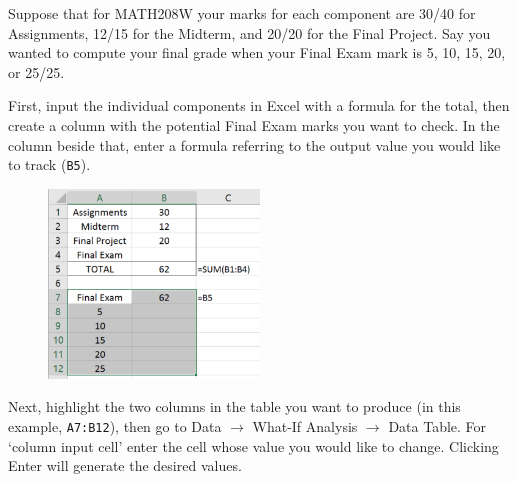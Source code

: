\begin{myexample}
Suppose that for MATH208W your marks for each component are 30/40 for Assignments, 12/15 for the Midterm, and 20/20 for the Final Project.
Say you wanted to compute your final grade when your Final Exam mark is 5, 10, 15, 20, or 25/25.

First, input the individual components in Excel with a formula for the total, then create a column with the potential Final Exam marks you want to check.
In the column beside that, enter a formula referring to the output value you would like to track (\texttt{B5}).

\begin{figure}[htbp]
	\centering
	\includegraphics[width=0.5\textwidth]{fig/2_data_table_exA.png}
	\label{fig:2_data_table_exA}
\end{figure}

Next, highlight the two columns in the table you want to produce (in this example, \texttt{A7:B12}), then go to Data $\rightarrow$ What-If Analysis $\rightarrow$ Data Table.
For `column input cell' enter the cell whose value you would like to change.
Clicking Enter will generate the desired values.




\end{myexample}

